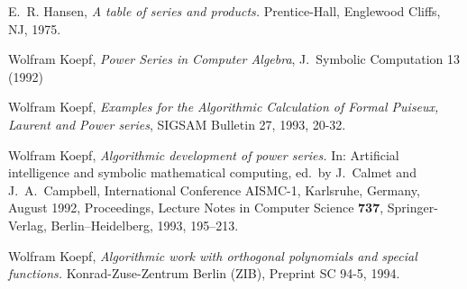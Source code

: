 \begin{thebibliography}{9}

E.\ R. Hansen, {\em A table of series and products.}
Prentice-Hall, Englewood Cliffs, NJ, 1975.

 Wolfram Koepf,
{\em Power Series in Computer Algebra},
J.\ Symbolic Computation 13 (1992)

 Wolfram Koepf,
{\em Examples for the Algorithmic Calculation of Formal
Puiseux, Laurent and Power series},
SIGSAM Bulletin 27, 1993, 20-32.

 Wolfram Koepf,
{\em Algorithmic development of power series.} In:
Artificial intelligence and symbolic mathematical computing,
ed.\ by J.\ Calmet and J.\ A.\ Campbell,
International Conference AISMC-1, Karlsruhe, Germany, August 1992, Proceedings,
Lecture Notes in Computer Science {\bf 737}, Springer-Verlag,
Berlin--Heidelberg, 1993, 195--213.

 Wolfram Koepf,
{\em Algorithmic work with orthogonal polynomials and special functions.}
Konrad-Zuse-Zentrum Berlin (ZIB), Preprint SC 94-5, 1994.

\end{thebibliography}





